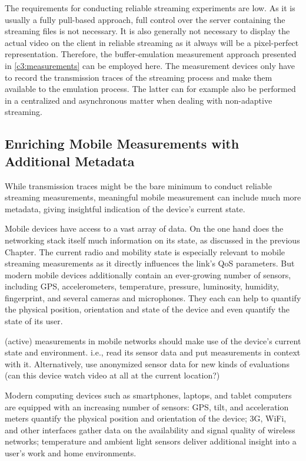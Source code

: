 The requirements for conducting reliable streaming experiments are low. As it is usually a fully pull-based approach, full control over the server containing the streaming files is not necessary. It is also generally not necessary to display the actual video on the client in reliable streaming as it always will be a pixel-perfect representation. Therefore, the buffer-emulation measurement approach presented in \ref{c3:measurements} can be employed here. The measurement devices only have to record the transmission traces of the streaming process and make them available to the emulation process. The latter can for example also be performed in a centralized and asynchronous matter when dealing with non-adaptive streaming.


\subsection{Enriching Mobile Measurements with Additional Metadata}
\label{c6:sensorium}

While transmission traces might be the bare minimum to conduct reliable streaming measurements, meaningful mobile measurement can include much more metadata, giving insightful indication of the device's current state.

Mobile devices have access to a vast array of data. On the one hand does the networking stack itself much information on its state, as discussed in the previous Chapter. The current radio and mobility state is especially relevant to mobile streaming measurements as it directly influences the link's \gls{QoS} parameters. But modern mobile devices additionally contain an ever-growing number of sensors, including \gls{GPS}, accelerometers, temperature, pressure, luminosity, humidity, fingerprint, and several cameras and microphones. They each can help to quantify the physical position, orientation and state of the device and even quantify the state of its user.



(active) measurements in mobile networks should make use of the device's current state and environment. i.e., read its sensor data and put measurements in context with it. Alternatively, use anonymized sensor data for new kinds of evaluations (can this device watch video at all at the current location?)

Modern computing devices such as smartphones, laptops, and tablet computers are equipped with an increasing number of sensors: \gls{GPS}, tilt, and acceleration meters quantify the physical position and orientation of the device; 3G, WiFi, and other  interfaces gather data on the availability and signal quality of wireless networks; temperature and ambient light sensors deliver additional insight into a user's work and home environments.

